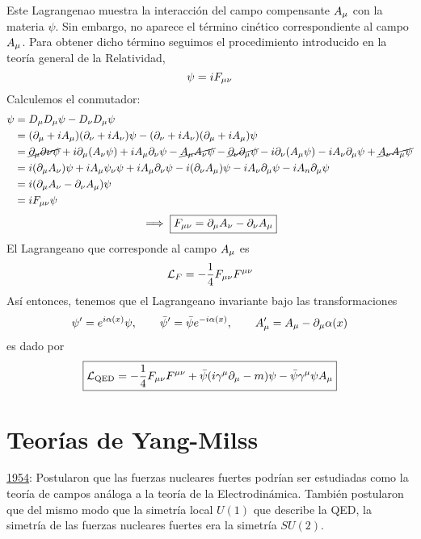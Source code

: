 Este Lagrangenao muestra la interacción del campo compensante $A_\mu $ con la materia $\psi$. Sin embargo, no aparece el término cinético correspondiente al campo $A_\mu $. Para obtener dicho término seguimos el procedimiento introducido en la teoría general de la Relatividad,
\begin{equation}
  [D_\m ,D_\n ]\psi=iF_{\m\n }
\end{equation}
Calculemos el conmutador:
\begin{align*}
  [D_\m ,D_\n ]\psi&=D_\m D_\m \psi-D_\n D_\m \psi\\
  &=(\partial_\m +iA_\m )(\partial_\n  +iA_\n  )\psi -(\partial_\n  +iA_\n  )(\partial_\m +iA_\m )\psi\\
  &=\cancel{\partial_\m \partial\n \psi}+i\partial_\m (A_\n \psi)+iA_\m \partial_\n \psi-\cancel{A_\m A_\n \psi}-\cancel{\partial_\n \partial_\m \psi}-i\partial_\n (A_\m \psi)-iA_\n \partial_\m \psi+\cancel{A_\n A_\m \psi}\\
  &=i(\partial_\m A_\n )\psi+iA_\m \psi_\n \psi+iA_\m \partial_\n \psi-i(\partial_\n A_\m )\psi-iA_\n \partial_\m \psi-iA_n\partial_\m \psi\\
  &=i(\partial_\m A_\n -\partial_\n A_\m )\psi\\
  &=iF_{\m\n }\psi
\end{align*}
\begin{equation}
  \implies \boxed{F_{\mu\nu}=\partial_\mu A_\nu -\partial_\nu A_\mu }
\end{equation}
El Lagrangeano que corresponde al campo $A_\mu $ es
\begin{equation}
  \mathcal{L}_F=-\frac{1}{4}F_{\mu\nu}F^{\mu\nu }
\end{equation}
Así entonces, tenemos que el Lagrangeano invariante bajo las transformaciones
\begin{equation}
  \psi'=e^{i\alpha (x)}\psi,\qquad \bar{\psi}'=\bar{\psi}e^{-i\alpha (x)},\qquad A_\mu'=A_\mu -\partial_\mu \alpha(x)
\end{equation}
es dado por
\begin{equation}
 \boxed{ \mathcal{L}_{\rm QED}=-\frac{1}{4}F_{\mu\nu }F^{\mu\nu }+\bar{\psi}(i\gamma^\mu \partial_\mu -m)\psi-\bar{\psi}\gamma^\mu \psi A_\mu }
\end{equation}

\part{Teorías de Yang-Milss}
\underline{1954}: Postularon que las fuerzas nucleares fuertes podrían ser estudiadas como la teoría de campos análoga a la teoría de la Electrodinámica. También postularon que del mismo modo que la simetría local $U(1)$ que describe la QED, la simetría de las fuerzas nucleares fuertes era la simetría $SU(2)$.

